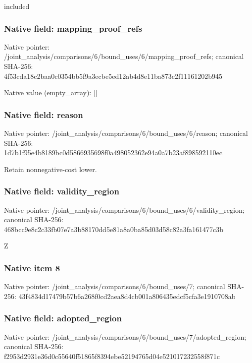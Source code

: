 \documentclass[10pt,a4paper]{article}
\begin{document}
\begingroup\raggedright\sloppy included\par\endgroup

\subsubsection{Native field: mapping\_\allowbreak{}proof\_\allowbreak{}refs}
Native pointer: /joint\_\allowbreak{}analysis/comparisons/6/bound\_\allowbreak{}uses/6/mapping\_\allowbreak{}proof\_\allowbreak{}refs; canonical SHA-256: 4f53cda18c2baa0c0354bb5f9a3ecbe5ed12ab4d8e11ba873c2f11161202b945

Native value (empty\_\allowbreak{}array): []

\subsubsection{Native field: reason}
Native pointer: /joint\_\allowbreak{}analysis/comparisons/6/bound\_\allowbreak{}uses/6/reason; canonical SHA-256: 1d7b1f95e4b8189bc0d5866935698f0a498052362e94a0a7b23af898592110ec

\begingroup\raggedright\sloppy Retain nonnegative-cost lower.\par\endgroup

\subsubsection{Native field: validity\_\allowbreak{}region}
Native pointer: /joint\_\allowbreak{}analysis/comparisons/6/bound\_\allowbreak{}uses/6/validity\_\allowbreak{}region; canonical SHA-256: 468bcc9e8c2c33fb07e7a3b88170dd5e81a8a0ba85d03d58c82a3fa161477c3b

\begingroup\raggedright\sloppy Z\par\endgroup

\subsubsection{Native item 8}
Native pointer: /joint\_\allowbreak{}analysis/comparisons/6/bound\_\allowbreak{}uses/7; canonical SHA-256: 43f4834d17479b57b6a268f0cd2aea8d4cb001a806435edcf5cfa3e1910708ab

\subsubsection{Native field: adopted\_\allowbreak{}region}
Native pointer: /joint\_\allowbreak{}analysis/comparisons/6/bound\_\allowbreak{}uses/7/adopted\_\allowbreak{}region; canonical SHA-256: f2953d2931e36d0c55640f51865f8394ebe52194765d04e521017232558f871c
\end{document}
